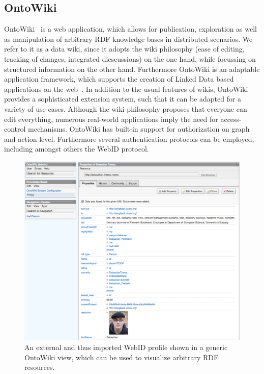 \documentclass[a4paper]{llncs}
\begin{document}
\subsection{OntoWiki}
OntoWiki~\cite{auer-s-2006-736-a} is a web application, which allows for publication, exploration as well as manipulation of arbitrary RDF knowledge bases in distributed scenarios.
We refer to it as a data wiki, since it adopts the wiki philosophy (ease of editing, tracking of changes, integrated dicscussions) on the one hand, while focussing on structured information on the other hand.
Furthermore OntoWiki is an adaptable application framework, which supports the creation of Linked Data based applications on the web~\cite{heino-n-2009-61-a}.
In addition to the usual features of wikis, OntoWiki provides a sophisticated extension system, such that it can be adapted for a variety of use-cases.
Although the wiki philosophy proposes that everyone can edit everything, numerous real-world applications imply the need for access-control mechanisms.
OntoWiki has built-in support for authorization on graph and action level.
Furthermore several authentication protocols can be employed, including amongst others the WebID protocol.

\begin{figure}[htb]
  \centering
  \includegraphics[width=\textwidth]{ontowiki}
  \caption{An external and thus imported WebID profile shown in a generic OntoWiki view, which can be used to visualize arbitrary RDF resources.}
  \label{fig:ontowiki}
\end{figure}
\end{document}
